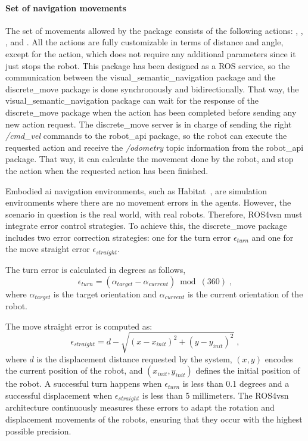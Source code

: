 \paragraph*{\textbf{Set of navigation movements}}\label{par:movement-set}

The set of movements allowed by the package consists of the following actions: \turnleft, \turnright, \moveforward, \movebackward and \stopac.
All the actions are fully customizable in terms of distance and angle, except for the \stopac action, which does not require any additional parameters since it just stops the robot.
This package has been designed as a ROS service, so the communication between the visual\_semantic\_navigation package and the discrete\_move package is done synchronously and bidirectionally.
That way, the visual\_semantic\_navigation package can wait for the response of the discrete\_move package when the action has been completed before sending any new action request.
The discrete\_move server is in charge of sending the right \textit{/cmd\_vel} commands to the robot\_api package, so the robot can execute the requested action and receive the \textit{/odometry} topic information from the robot\_api package.
That way, it can calculate the movement done by the robot, and stop the action when the requested action has been finished.

Embodied \acrshort{ai} navigation environments, such as Habitat~\cite{NEURIPS2021_021bbc7e}, are simulation environments where there are no movement errors in the agents.
However, the scenario in question is the real world, with real robots.
Therefore, ROS4\acrshort{vsn} must integrate error control strategies.
To achieve this, the discrete\_move package includes two error correction strategies: one for the turn error $\epsilon_{turn}$ and one for the move straight error $\epsilon_{straight}$.

The turn error is calculated in degrees as follows,
\begin{equation}
    \label{eq:turn_error}
    \epsilon_{turn} = (\alpha_{target}- \alpha_{current}) \bmod(360)\; ,
\end{equation}
where $\alpha_{target}$ is the target orientation and $\alpha_{current}$ is the current orientation of the robot.

The move straight error is computed as:
\begin{equation}
    \label{eq:error_move}
    \epsilon_{straight} = {d - \sqrt{(x-x_{init})^2+(y-y_{init})^2}}\; ,
\end{equation}
where $d$ is the displacement distance requested by the system, $(x,y)$ encodes the current position of the robot, and $(x_{init},y_{init})$ defines the initial position of the robot.
A successful turn happens when $\epsilon_{turn}$ is less than 0.1 degrees and a successful displacement when $\epsilon_{straight}$ is less than 5 millimeters.
The ROS4\acrshort{vsn} architecture continuously measures these errors to adapt the rotation and displacement movements of the robots, ensuring that they occur with the highest possible precision.

